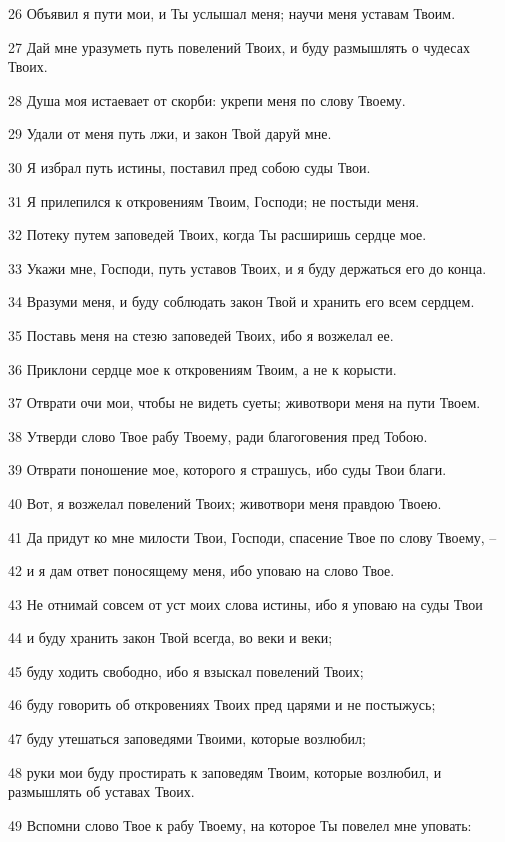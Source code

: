 \par 26 Объявил я пути мои, и Ты услышал меня; научи меня уставам Твоим.
\par 27 Дай мне уразуметь путь повелений Твоих, и буду размышлять о чудесах Твоих.
\par 28 Душа моя истаевает от скорби: укрепи меня по слову Твоему.
\par 29 Удали от меня путь лжи, и закон Твой даруй мне.
\par 30 Я избрал путь истины, поставил пред собою суды Твои.
\par 31 Я прилепился к откровениям Твоим, Господи; не постыди меня.
\par 32 Потеку путем заповедей Твоих, когда Ты расширишь сердце мое.
\par 33 Укажи мне, Господи, путь уставов Твоих, и я буду держаться его до конца.
\par 34 Вразуми меня, и буду соблюдать закон Твой и хранить его всем сердцем.
\par 35 Поставь меня на стезю заповедей Твоих, ибо я возжелал ее.
\par 36 Приклони сердце мое к откровениям Твоим, а не к корысти.
\par 37 Отврати очи мои, чтобы не видеть суеты; животвори меня на пути Твоем.
\par 38 Утверди слово Твое рабу Твоему, ради благоговения пред Тобою.
\par 39 Отврати поношение мое, которого я страшусь, ибо суды Твои благи.
\par 40 Вот, я возжелал повелений Твоих; животвори меня правдою Твоею.
\par 41 Да придут ко мне милости Твои, Господи, спасение Твое по слову Твоему, --
\par 42 и я дам ответ поносящему меня, ибо уповаю на слово Твое.
\par 43 Не отнимай совсем от уст моих слова истины, ибо я уповаю на суды Твои
\par 44 и буду хранить закон Твой всегда, во веки и веки;
\par 45 буду ходить свободно, ибо я взыскал повелений Твоих;
\par 46 буду говорить об откровениях Твоих пред царями и не постыжусь;
\par 47 буду утешаться заповедями Твоими, которые возлюбил;
\par 48 руки мои буду простирать к заповедям Твоим, которые возлюбил, и размышлять об уставах Твоих.
\par 49 Вспомни слово Твое к рабу Твоему, на которое Ты повелел мне уповать:
